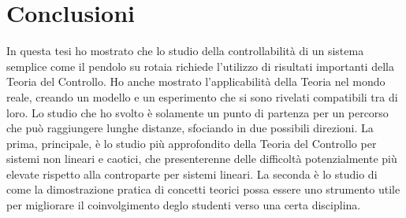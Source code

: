 \chapter{Conclusioni}
In questa tesi ho mostrato che lo studio della
controllabilità di un sistema semplice come il
pendolo su rotaia richiede l'utilizzo di risultati importanti della
Teoria del Controllo.
Ho anche mostrato l'applicabilità della Teoria nel mondo reale,
creando un modello e un esperimento che si sono rivelati
compatibili tra di loro.
Lo studio che ho svolto è solamente un punto di partenza
per un percorso che può raggiungere lunghe distanze,
sfociando in due possibili direzioni.
La prima, principale, è lo studio più approfondito della Teoria del Controllo
per sistemi non lineari e caotici, che presenterenne delle difficoltà
potenzialmente più elevate rispetto alla controparte per sistemi lineari.
La seconda è lo studio di come la dimostrazione
pratica di concetti teorici possa essere uno strumento utile per migliorare il
coinvolgimento deglo studenti verso una certa disciplina.
